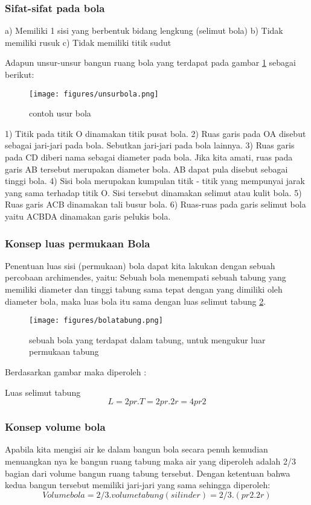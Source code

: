 \subsubsection{Sifat-sifat pada bola} 
a) Memiliki 1 sisi yang berbentuk bidang lengkung (selimut bola) 
b) Tidak memiliki rusuk 
c) Tidak memiliki titik sudut
 
Adapun unsur-unsur bangun ruang bola yang terdapat pada gambar \ref{unsur bola} sebagai berikut:
\begin{figure}[ht]
    \centerline{\texttt{[image: figures/unsurbola.png]}}
    \caption{contoh usur bola}
    \label{unsur bola}
    \end{figure}
1) Titik pada titik O dinamakan titik pusat bola.
2) Ruas garis pada OA disebut sebagai jari-jari pada bola. Sebutkan jari-jari pada bola lainnya.
3) Ruas garis pada CD diberi nama sebagai diameter pada bola. Jika kita amati, ruas pada garis AB tersebut merupakan diameter bola. AB dapat pula disebut sebagai tinggi bola.
4) Sisi bola merupakan kumpulan titik - titik yang mempunyai jarak yang sama terhadap titik O. Sisi tersebut dinamakan selimut atau kulit bola.
5) Ruas garis ACB dinamakan tali busur bola.
6) Ruas-ruas pada garis selimut bola yaitu ACBDA dinamakan garis pelukis bola.

\subsubsection{Konsep luas permukaan Bola}
Penentuan luas sisi (permukaan) bola dapat kita lakukan dengan sebuah percobaan archimendes, yaitu:
Sebuah bola menempati sebuah tabung yang memiliki diameter dan tinggi tabung sama tepat dengan 
yang dimiliki oleh diameter bola, maka luas bola itu sama dengan luas selimut tabung \ref{bola tabung}.
\begin{figure}[ht]
    \centerline{\texttt{[image: figures/bolatabung.png]}}
    \caption{sebuah bola yang terdapat dalam tabung, untuk mengukur luar permukaan tabung}
    \label{bola tabung}
    \end{figure} 
Berdasarkan gambar maka diperoleh :

Luas selimut tabung 
\begin{equation}
					L= 2 pr. T
                    = 2pr. 2r
                    = 4pr2
\end{equation}
            
\subsubsection{Konsep volume bola}
Apabila kita mengisi air ke dalam bangun bola secara penuh 
kemudian menuangkan nya ke bangun ruang tabung maka air yang diperoleh adalah 2/3 bagian dari volume bangun ruang tabung tersebut. 
Dengan ketentuan bahwa kedua bangun tersebut memiliki jari-jari yang sama sehingga diperoleh:
\begin{equation}
Volume bola = 2/3 . volume tabung(silinder)
            = 2/3 . (pr2 . 2r)
\end{equation}

